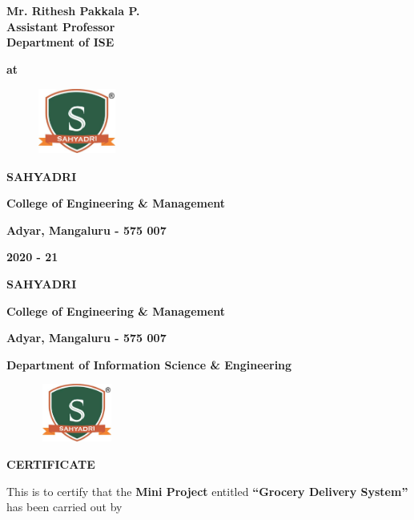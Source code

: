 \documentclass[12pt,a4paper]{report}
\begin{document}
\begin{center}
\textbf{\large Mr. Rithesh Pakkala P.}\\
\normalsize\textbf{ Assistant Professor}\\
\normalsize\textbf{Department of ISE}\\
\par
\vspace{0.5pt}
\normalsize \centering \textbf{at}\\
\begin{figure}[hbtp]
\centering
\includegraphics[width=1.0in,height=0.85in]{../fig/registered}
\end{figure}
{\LARGE \textbf{SAHYADRI}}
\par
\vspace{6pt}
{\large \textbf{College of Engineering \& Management}}
\par
\vspace{3pt}
{\large \textbf{Adyar, Mangaluru - 575 007}}
\par
\vspace{3pt}
{\large \textbf{2020 - 21}}

\newpage

{\LARGE \textbf{SAHYADRI}}
\par
\vspace{6pt}
{\Large \textbf{College of Engineering \& Management}}
\par
\vspace{3pt}
{\large \textbf{Adyar, Mangaluru - 575 007}}
\par
\vspace{0.25in}
{\large \textbf{Department of Information Science \& Engineering}}
\par
\begin{figure}[hbtp]
\centering
\includegraphics[width=1.0in,height=0.75in]{../fig/registered}
\end{figure}
{\Large \textbf{CERTIFICATE}}
\end{center}
\par
\vspace{0.10in}
\noindent This is to certify that the \textbf{Mini Project} entitled \textbf{``Grocery   Delivery   System''}  has been carried out by 
\end{document}
